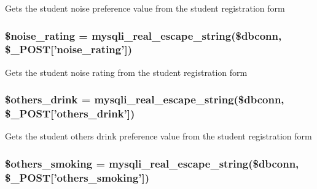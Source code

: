 \-Gets the student noise preference value from the student registration form \hypertarget{user__view_2validate_2studentVal_8php_a92d14fe0154487caa69f117986fb08da}{
\subsubsection[{\$noise\-\_\-rating}]{\setlength{\rightskip}{0pt plus 5cm}\$noise\-\_\-rating = mysqli\-\_\-real\-\_\-escape\-\_\-string(\$dbconn, \$\-\_\-\-P\-O\-S\-T\mbox{[}'noise\-\_\-rating'\mbox{]})}}\label{user__view_2validate_2studentVal_8php_a92d14fe0154487caa69f117986fb08da}
\-Gets the student noise rating from the student registration form \hypertarget{user__view_2validate_2studentVal_8php_ad8d98a0ffa836c8f5ff6cd94cc18dca1}{
\subsubsection[{\$others\-\_\-drink}]{\setlength{\rightskip}{0pt plus 5cm}\$others\-\_\-drink = mysqli\-\_\-real\-\_\-escape\-\_\-string(\$dbconn, \$\-\_\-\-P\-O\-S\-T\mbox{[}'others\-\_\-drink'\mbox{]})}}\label{user__view_2validate_2studentVal_8php_ad8d98a0ffa836c8f5ff6cd94cc18dca1}
\-Gets the student others drink preference value from the student registration form \hypertarget{user__view_2validate_2studentVal_8php_a41f287196869fc73324563f84fc1ea73}{
\subsubsection[{\$others\-\_\-smoking}]{\setlength{\rightskip}{0pt plus 5cm}\$others\-\_\-smoking = mysqli\-\_\-real\-\_\-escape\-\_\-string(\$dbconn, \$\-\_\-\-P\-O\-S\-T\mbox{[}'others\-\_\-smoking'\mbox{]})}}\label{user__view_2validate_2studentVal_8php_a41f287196869fc73324563f84fc1ea73}
